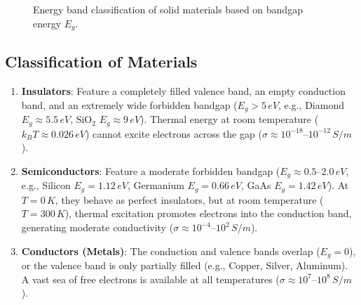 \begin{figure}[htbp]
\caption{Energy band classification of solid materials based on bandgap energy $E_g$.}
\label{fig:band-classification}
\end{figure}

\subsection{Classification of Materials}
\begin{enumerate}
    \item \textbf{Insulators}: Feature a completely filled valence band, an empty conduction band, and an extremely wide forbidden bandgap ($E_g > 5\,\si{eV}$, e.g., Diamond $E_g \approx 5.5\,\si{eV}$, $\text{SiO}_2$ $E_g \approx 9\,\si{eV}$). Thermal energy at room temperature ($k_B T \approx 0.026\,\si{eV}$) cannot excite electrons across the gap ($\sigma \approx 10^{-18}\text{--}10^{-12}\,\si{S/m}$).
    \item \textbf{Semiconductors}: Feature a moderate forbidden bandgap ($E_g \approx 0.5\text{--}2.0\,\si{eV}$, e.g., Silicon $E_g = 1.12\,\si{eV}$, Germanium $E_g = 0.66\,\si{eV}$, GaAs $E_g = 1.42\,\si{eV}$). At $T = 0\,\si{K}$, they behave as perfect insulators, but at room temperature ($T = 300\,\si{K}$), thermal excitation promotes electrons into the conduction band, generating moderate conductivity ($\sigma \approx 10^{-4}\text{--}10^{2}\,\si{S/m}$).
    \item \textbf{Conductors (Metals)}: The conduction and valence bands overlap ($E_g = 0$), or the valence band is only partially filled (e.g., Copper, Silver, Aluminum). A vast sea of free electrons is available at all temperatures ($\sigma \approx 10^7\text{--}10^8\,\si{S/m}$).
\end{enumerate}

